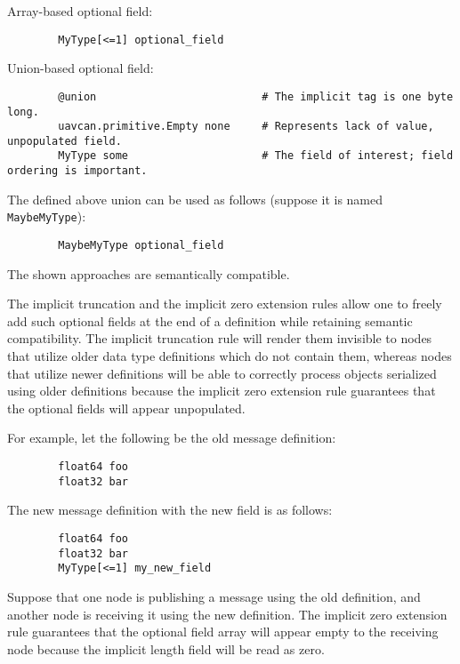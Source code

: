 \begin{remark}[breakable]
    Array-based optional field:

    \begin{verbatim}
        MyType[<=1] optional_field
    \end{verbatim}

    Union-based optional field:

    \begin{verbatim}
        @union                          # The implicit tag is one byte long.
        uavcan.primitive.Empty none     # Represents lack of value, unpopulated field.
        MyType some                     # The field of interest; field ordering is important.
    \end{verbatim}

    The defined above union can be used as follows (suppose it is named \verb|MaybeMyType|):

    \begin{verbatim}
        MaybeMyType optional_field
    \end{verbatim}

    The shown approaches are semantically compatible.
\end{remark}

\begin{remark}[breakable]
    The implicit truncation and the implicit zero extension rules allow one to freely add such optional fields
    at the end of a definition while retaining semantic compatibility.
    The implicit truncation rule will render them invisible to nodes that utilize older data type definitions
    which do not contain them, whereas nodes that utilize newer definitions will be able to correctly process
    objects serialized using older definitions because the implicit zero extension rule guarantees
    that the optional fields will appear unpopulated.

    For example, let the following be the old message definition:

    \begin{verbatim}
        float64 foo
        float32 bar
    \end{verbatim}

    The new message definition with the new field is as follows:

    \begin{verbatim}
        float64 foo
        float32 bar
        MyType[<=1] my_new_field
    \end{verbatim}

    Suppose that one node is publishing a message using the old definition,
    and another node is receiving it using the new definition.
    The implicit zero extension rule guarantees that the optional field array will
    appear empty to the receiving node because the implicit length field will be read as zero.
\end{remark}

